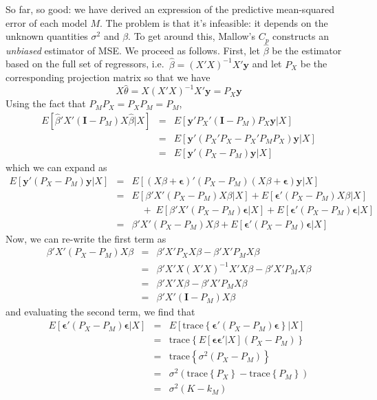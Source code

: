 So far, so good: we have derived an expression of the predictive mean-squared error of each model $M$. The problem is that it's infeasible: it depends on the unknown quantities $\sigma^2$ and $\beta$. To get around this, Mallow's $C_p$ constructs an \emph{unbiased} estimator of MSE. We proceed as follows. First, let $\widehat{\beta}$ be the estimator based on the full set of regressors, i.e.\ $\widehat{\beta} = (X'X)^{-1}X'\mathbf{y}$ and let $P_{X}$ be the corresponding projection matrix so that we have 
		$$X \widehat{\theta} = X(X'X)^{-1}X'\mathbf{y} = P_{X}\mathbf{y}$$
Using the fact that $P_MP_X = P_XP_M = P_M$, 
	\begin{eqnarray*}
		E\left[\widehat{\beta}'X'(\mathbf{I} - P_M)X\widehat{\beta} |X\right] &=& E\left[\mathbf{y}'P_X'(\mathbf{I} - P_M)P_{X}\mathbf{y} |X\right]\\
			&=& E\left[\mathbf{y}'(P_X'P_X - P_X'P_MP_X)\mathbf{y} |X\right]\\
			&=& E\left[\mathbf{y}'(P_X - P_M)\mathbf{y} |X\right]
	\end{eqnarray*}
which we can expand as
      \begin{eqnarray*}
     E\left[\mathbf{y}'(P_X - P_M)\mathbf{y} |X\right]&=& E\left[(X\beta + \boldsymbol{\epsilon})'(P_X - P_M)(X\beta + \boldsymbol{\epsilon})\mathbf{y} |X\right]\\
  		&=& E\left[\beta'X'(P_X - P_M)X\beta|X\right] + E[\boldsymbol{\epsilon}'(P_X - P_M)X\beta|X] \\
				&& \quad  + \; E[\beta'X'(P_X - P_M)\boldsymbol{\epsilon}|X] + E[\boldsymbol{\epsilon}'(P_X - P_M)\boldsymbol{\epsilon}|X]\\
			&=& \beta'X'(P_X - P_M)X\beta +  E[\boldsymbol{\epsilon}'(P_X - P_M)\boldsymbol{\epsilon}|X]
    \end{eqnarray*}
Now, we can re-write the first term as    
    \begin{eqnarray*}
    \beta'X'(P_X - P_M)X\beta  &=& \beta'X'P_X X\beta - \beta'X'P_MX\beta\\
      &=& \beta'X'X(X'X)^{-1}X' X\beta - \beta'X'P_MX\beta\\
      &=& \beta'X'X\beta - \beta'X'P_MX\beta\\
      &=& \beta'X'(\textbf{I} - P_M)X\beta
    \end{eqnarray*}
and evaluating the second term, we find that
    \begin{eqnarray*}
			E[\boldsymbol{\epsilon}'(P_X - P_M)\boldsymbol{\epsilon}|X]&=&E[\mbox{trace}\left\{\boldsymbol{\epsilon}'(P_X - P_M)\boldsymbol{\epsilon}\right\}|X]\\
      &=&  \mbox{trace}\left\{E[\boldsymbol{\boldsymbol{\epsilon}\epsilon}'|X](P_X - P_M)\right\}\\
			&=&\mbox{trace}\left\{\sigma^2(P_X - P_M)\right\}\\ 
			&=& \sigma^2 \left(\mbox{trace}\left\{P_X\right\} - \mbox{trace}\left\{P_M\right\}\right)\\ 
			&=& \sigma^2 (K - k_M) 
      \end{eqnarray*}
